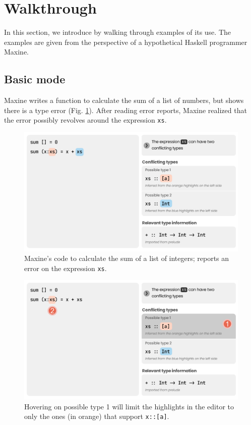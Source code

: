 \section{Walkthrough} \label{sec:walkthrough}
In this section, we introduce \chameleon{} by walking through examples of its
use. The examples are given from the perspective of a hypothetical Haskell 
programmer Maxine. 


\subsection{Basic mode} \label{sub:basic}
Maxine writes a function to calculate the sum of a list of
numbers, but \chameleon{} shows there is a type error (Fig. \ref{fig:basic-mode-1}). 
After reading error reports, Maxine realized that the error possibly revolves 
around the expression \texttt{xs}.

\begin{figure}[h]
        \centering
        \includegraphics[width=\linewidth]{images/basic-mode-1.pdf}
        \caption{
            Maxine's code to calculate the sum of a list of integers;
            \chameleon{} reports an error on the expression \texttt{xs}.
            }
            \label{fig:basic-mode-1}
\end{figure}

\begin{figure}[h]
        \centering
        \includegraphics[width=\linewidth]{images/basic-mode-2.pdf}
        \caption{
       Hovering on possible type 1 will limit the highlights 
       in the editor to only the ones (in orange) that support \texttt{x::[a]}.
        }
        \label{fig:basic-mode-2}
\end{figure}

